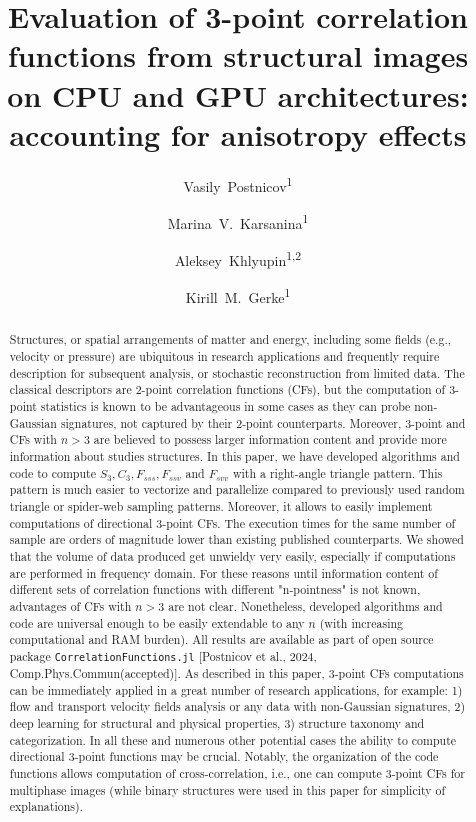 \documentclass[reprint,amsmath,amssymb,aps,pre,showkeys,showpacs]{revtex4-1}
\newcommand{\code}[1]{\colorbox{light-gray}{\texttt{#1}}}
\begin{document}

\author{Vasily~Postnicov\textsuperscript{1}}
\author{Marina~V.~Karsanina\textsuperscript{1}}
\author{Aleksey~Khlyupin\textsuperscript{1,2}}
\author{Kirill~M.~Gerke\textsuperscript{1}}


\title{Evaluation of 3-point correlation functions from structural images on CPU
  and GPU architectures: accounting for anisotropy effects}

\begin{abstract}
Structures, or spatial arrangements of matter and energy, including some fields
(e.g., velocity or pressure) are ubiquitous in research applications and
frequently require description for subsequent analysis, or stochastic
reconstruction from limited data.  The classical descriptors are 2-point
correlation functions (CFs), but the computation of 3-point statistics is known
to be advantageous in some cases as they can probe non-Gaussian signatures, not
captured by their 2-point counterparts.  Moreover, 3-point and CFs with $n>3$
are believed to possess larger information content and provide more information
about studies structures. In this paper, we have developed algorithms and code
to compute $S_3, C_3, F_{sss}, F_{ssv}$ and $F_{svv}$ with a right-angle
triangle pattern. This pattern is much easier to vectorize and parallelize
compared to previously used random triangle or spider-web sampling
patterns. Moreover, it allows to easily implement computations of directional
3-point CFs. The execution times for the same number of sample are orders of
magnitude lower than existing published counterparts. We showed that the volume
of data produced get unwieldy very easily, especially if computations are
performed in frequency domain. For these reasons until information content of
different sets of correlation functions with different "n-pointness" is not
known, advantages of CFs with $n>3$ are not clear. Nonetheless, developed
algorithms and code are universal enough to be easily extendable to any $n$
(with increasing computational and RAM burden). All results are available as
part of open source package \code{CorrelationFunctions.jl} [Postnicov et al.,
  2024, Comp.Phys.Commun(accepted)]. As described in this paper, 3-point CFs
computations can be immediately applied in a great number of research
applications, for example: 1) flow and transport velocity fields analysis or any
data with non-Gaussian signatures, 2) deep learning for structural and physical
properties, 3) structure taxonomy and categorization.  In all these and numerous
other potential cases the ability to compute directional 3-point functions may
be crucial. Notably, the organization of the code functions allows computation
of cross-correlation, i.e., one can compute 3-point CFs for multiphase images
(while binary structures were used in this paper for simplicity of
explanations).
\end{abstract}
\end{document}
